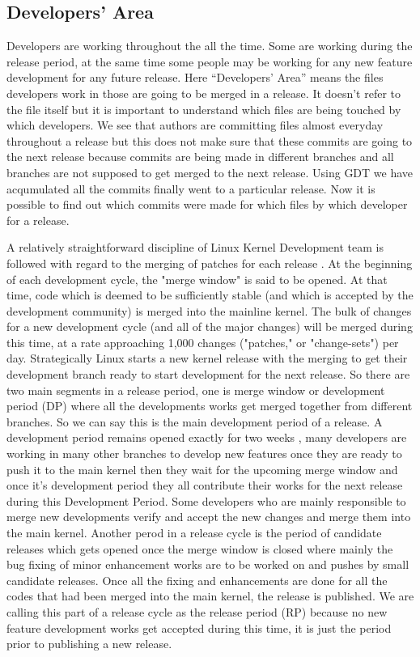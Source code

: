 \documentclass{acm_proc_article-sp}
\begin{document}
\subsection{Developers' Area}
Developers are working throughout the all the time. Some are working during the release period, at the same time some people may be working for any new feature development for any future release. Here ``Developers' Area'' means the files developers work in those are going to be merged in a release. It doesn't refer to the file itself but it is important to understand which files are being touched by which developers. We see that authors are committing files almost everyday throughout a release but this does not make sure that these commits are going to the next release because commits are being made in different branches and all branches are not supposed to get merged to the next release. Using GDT we have acqumulated all the commits finally went to a particular release. Now it is possible to find out which commits were made for which files by which developer for a release.

A relatively straightforward discipline of Linux Kernel Development team is followed with regard to the merging of patches for each release \cite{linux_kernel}. At the beginning of each development cycle, the "merge window" is said to be opened. At that time, code which is deemed to be sufficiently stable (and which is accepted by the development community) is merged into the mainline kernel. The bulk of changes for a new development cycle (and all of the major changes) will be merged during this time, at a rate approaching 1,000 changes ("patches," or "change-sets") per day. Strategically Linux starts a new kernel release with the merging to get their development branch ready to start development for the next release. So there are two main segments in a release period, one is merge window or development period (DP) where all the developments works get merged together from different branches. So we can say this is the main development period of a release. A development period remains opened exactly for two weeks \cite{linux_kernel}, many developers are working in many other branches to develop new features once they are ready to push it to the main kernel then they wait for the upcoming merge window and once it's development period they all contribute their works for the next release during this Development Period. Some developers who are mainly responsible to merge new developments verify and accept the new changes and merge them into the main kernel. Another perod in a release cycle is the period of candidate releases which gets opened once the merge window is closed where mainly the bug fixing of minor enhancement works are to be worked on and pushes by small candidate releases. Once all the fixing and enhancements are done for all the codes that had been merged into the main kernel, the release is published. We are calling this part of a release cycle as the release period (RP) because no new feature development works get accepted during this time, it is just the period prior to publishing a new release.
\end{document}
